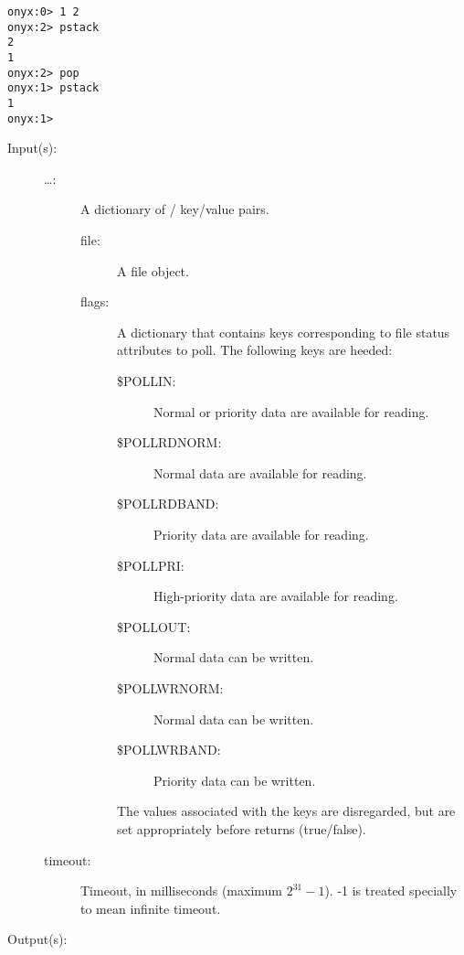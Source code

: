 \begin{description}
\begin{description}
\begin{verbatim}
onyx:0> 1 2
onyx:2> pstack
2
1
onyx:2> pop
onyx:1> pstack
1
onyx:1>
		\end{verbatim}
	\end{description}
\label{systemdict:poll}
\item[{\onyxop{{\lt}file flags \dots{\gt} timeout}{poll}{{\lb}file
      \dots{\rb}}}: ]
	\begin{description}\item[]
	\item[Input(s): ]
		\begin{description}\item[]
		\item[{\lt}\dots{\gt}: ]
			A dictionary of / key/value
			pairs.
			\begin{description}%
			\item[file: ]
				A file object.
			\item[flags: ]
				A dictionary that contains keys corresponding to
				file status attributes to poll.  The following
				keys are heeded:
				\begin{description}%
				\item[\$POLLIN: ]
					Normal or priority data are available
					for reading.
				\item[\$POLLRDNORM: ]
					Normal data are available for reading.
				\item[\$POLLRDBAND: ]
					Priority data are available for reading.
				\item[\$POLLPRI: ]
					High-priority data are available for
					reading.
				\item[\$POLLOUT: ]
					Normal data can be written.
				\item[\$POLLWRNORM: ]
					Normal data can be written.
				\item[\$POLLWRBAND: ]
					Priority data can be written.
				\end{description}
				The values associated with the keys are
				disregarded, but are set appropriately before
				 returns (true/false).
			\end{description}
		\item[timeout: ]
			Timeout, in milliseconds (maximum $2^{31} - 1$).  -1 is
			treated specially to mean infinite timeout.
		\end{description}
	\item[Output(s): ]
		\begin{description}\item[]

\end{description}
\end{description}
\end{description}
